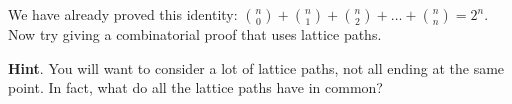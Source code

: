 \documentclass{book}
\begin{document}
\setcounter{cpjt}{96}
\addtocounter{cpjt}{-1}
\begin{activity}\label{activity-89}
\hypertarget{p-685}{}%
We have already proved this identity: \(\binom{n}{0} + \binom{n}{1} + \binom{n}{2} + \ldots + \binom{n}{n} = 2^{n}\).  Now try giving a combinatorial proof that uses lattice paths.%
\par\smallskip%
\noindent\textbf{Hint}.\hypertarget{hint-50}{}\quad%
\hypertarget{p-686}{}%
You will want to consider a lot of lattice paths, not all ending at the same point.  In fact, what do all the lattice paths have in common?%
\par\smallskip%
\noindent\end{activity}

\clearpage
\end{document}
